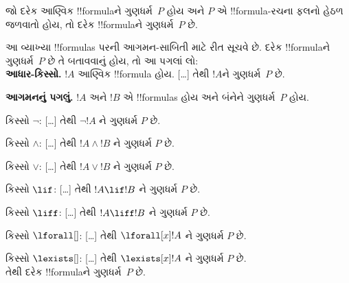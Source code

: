 \documentclass[../../../include/open-logic-section]{subfiles}
\begin{document}
\begin{defn}
જો દરેક આણ્વિક !!{formula}ને ગુણધર્મ~$P$ હોય અને
$P$ એ !!{formula}-રચના ફલનો હેઠળ જળવાતો હોય,
તો દરેક !!{formula}ને ગુણધર્મ~$P$ છે.
\end{defn}

\begin{explain}
આ વ્યાખ્યા !!{formula}s પરની આગમન-સાબિતી માટે રીત સૂચવે છે.
દરેક !!{formula}ને ગુણધર્મ~$P$ છે તે બતાવવાનું હોય,
તો આ પગલાં લો:\\

\textbf{આધાર-કિસ્સો.} $!A$ આણ્વિક !!{formula} હોય.
[\ldots] તેથી $!A$ને ગુણધર્મ~$P$ છે.

\textbf{આગમનનું પગલું.} $!A$ અને $!B$ એ !!{formula}s હોય
અને બંનેને ગુણધર્મ~$P$ હોય.

કિસ્સો $\lnot$: [\ldots] તેથી $\lnot !A$ ને ગુણધર્મ $P$ છે.

કિસ્સો $\land$: [\ldots] તેથી $!A \land !B$ ને ગુણધર્મ $P$ છે.

કિસ્સો $\lor$: [\ldots] તેથી $!A \lor !B$ ને ગુણધર્મ $P$ છે.

કિસ્સો $\lif$: [\ldots] તેથી $!A \lif !B$ ને ગુણધર્મ $P$ છે.

કિસ્સો $\liff$: [\ldots] તેથી $!A \liff !B$ ને ગુણધર્મ $P$ છે.

કિસ્સો $\lforall[]$: [\ldots] તેથી $\lforall[x] !A$ ને ગુણધર્મ $P$ છે.

કિસ્સો $\lexists[]$: [\ldots] તેથી $\lexists[x] !A$ ને ગુણધર્મ $P$ છે. \\

તેથી દરેક !!{formula}ને ગુણધર્મ~$P$ છે.
\end{explain}
\end{document}
